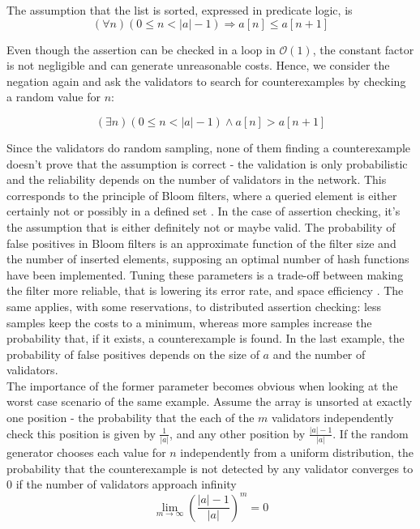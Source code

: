 The assumption that the list is sorted, expressed in predicate logic, is
\begin{equation}\label{eq:sorted}
	(\forall n) (0 \leq n < |a| - 1) \Rightarrow a[n] \leq a[n+1]
\end{equation}

Even though the assertion can be checked in a loop in $\mathcal{O}(1)$, the constant factor is not negligible and can generate unreasonable costs. Hence, we consider the negation again and ask the validators to search for counterexamples by checking a random value for $n$:
 
\begin{equation}\label{eq:sorted_neg}
	(\exists n) (0 \leq n < |a| - 1) \wedge a[n] > a[n+1]
\end{equation}

Since the validators do random sampling, none of them finding a counterexample doesn't prove that the assumption is correct - the validation is only probabilistic and the reliability depends on the number of validators in the network. This corresponds to the principle of Bloom filters, where a queried element is either certainly not or possibly in a defined set \cite{blustein_bloom_2002}. In the case of assertion checking, it's the assumption that is either definitely not or maybe valid. The probability of false positives in Bloom filters is an approximate function of the filter size and the number of inserted elements, supposing an optimal number of hash functions have been implemented. Tuning these parameters is a trade-off between making the filter more reliable, that is lowering its error rate, and space efficiency \cite{blustein_bloom_2002}. The same applies, with some reservations, to distributed assertion checking: less samples keep the costs to a minimum, whereas more samples increase the probability that, if it exists, a counterexample is found. In the last example, the probability of false positives depends on the size of $a$ and the number of validators.\\
The importance of the former parameter becomes obvious when looking at the worst case scenario of the same example. Assume the array is unsorted at exactly one position - the probability that the each of the $m$ validators independently check this position is given by $\frac{1}{|a|}$, and any other position by $\frac{|a|-1}{|a|}$. If the random generator chooses each value for $n$ independently from a uniform distribution, the probability that the counterexample is not detected by any validator converges to 0 if the number of validators approach infinity \cite{thiemann_2020}
\begin{equation}\label{eq:limes_validators}
	\lim_{m\to\infty} \left(\frac{|a|-1}{|a|}\right)^m = 0
\end{equation}

